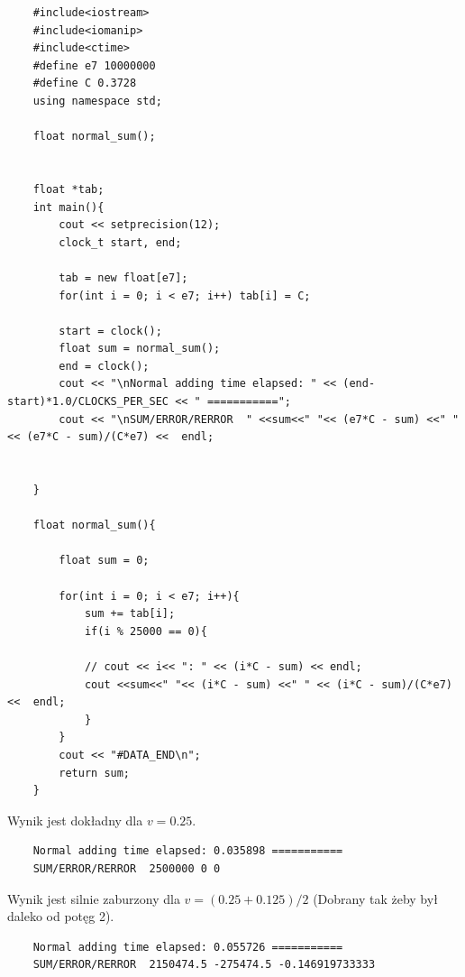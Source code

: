 \begin{verbatim}
	#include<iostream>
	#include<iomanip>
	#include<ctime>
	#define e7 10000000
	#define C 0.3728
	using namespace std;

	float normal_sum();


	float *tab;
	int main(){
		cout << setprecision(12);
		clock_t start, end;

		tab = new float[e7];
		for(int i = 0; i < e7; i++) tab[i] = C;

		start = clock();
		float sum = normal_sum();
		end = clock();
		cout << "\nNormal adding time elapsed: " << (end-start)*1.0/CLOCKS_PER_SEC << " ===========";
		cout << "\nSUM/ERROR/RERROR  " <<sum<<" "<< (e7*C - sum) <<" " << (e7*C - sum)/(C*e7) <<  endl;


	}

	float normal_sum(){
	
		float sum = 0;

		for(int i = 0; i < e7; i++){
			sum += tab[i];
			if(i % 25000 == 0){

			// cout << i<< ": " << (i*C - sum) << endl;
			cout <<sum<<" "<< (i*C - sum) <<" " << (i*C - sum)/(C*e7) <<  endl;
			}
		} 
		cout << "#DATA_END\n";
		return sum;
	}

\end{verbatim}

\clearpage
\newpage

Wynik jest dokładny dla $v = 0.25$.

\begin{lstlisting}
	Normal adding time elapsed: 0.035898 ===========
	SUM/ERROR/RERROR  2500000 0 0
\end{lstlisting}


Wynik jest silnie zaburzony dla $v = (0.25+0.125)/2$ (Dobrany tak żeby był daleko od potęg 2).

\begin{lstlisting}
	Normal adding time elapsed: 0.055726 ===========
	SUM/ERROR/RERROR  2150474.5 -275474.5 -0.146919733333	
\end{lstlisting}


